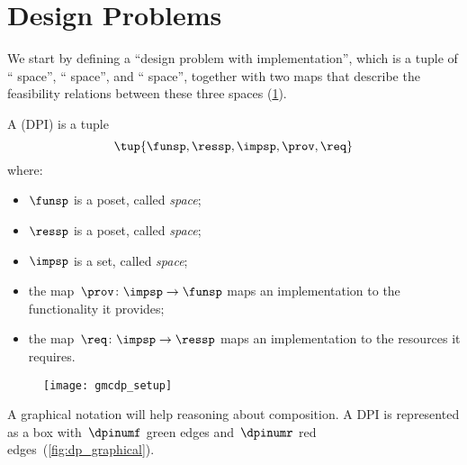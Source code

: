 

\section{Design Problems}
\label{sec:Design-Problems}

We start by defining a ``design problem with implementation'', which is a tuple of `` space'', `` space'', and `` space'', together with two maps that describe the feasibility relations between these three spaces (\cref{fig:setup}).

\begin{definition}
    \label{def:DPI}
    A \emph{} (DPI) is a tuple
    \begin{equation*}
        \tup{\funsp, \ressp, \impsp, \prov,\req}
    \end{equation*}
    where:

    \begin{itemize}
        \item $\funsp$ is a poset, called \emph{ space};
        \item $\ressp$ is a poset, called \emph{ space};
        \item $\impsp$ is a set, called \emph{ space};
        \item the map~$\prov\colon\impsp\rightarrow\funsp$
        maps an implementation to the functionality it provides;
        \item the map~$\req\colon\impsp\rightarrow\ressp$
        maps an implementation to the resources it requires.
    \end{itemize}

    \begin{figure}[h]
        \begin{center}
            \texttt{[image: gmcdp\_setup]}
        \end{center}
        \caption{\label{fig:setup}}
    \end{figure}
\end{definition}


A graphical notation will help reasoning about composition. A DPI is represented as a box with~$\dpinumf$ green edges and~$\dpinumr$ red edges~(\cref{fig:dp_graphical}).

